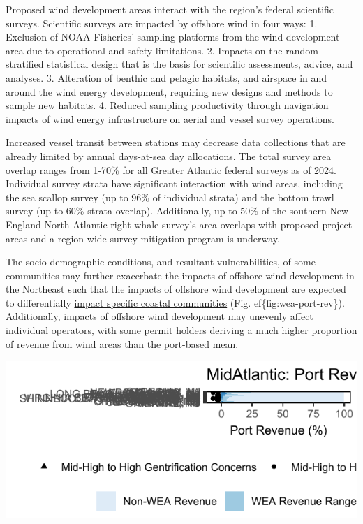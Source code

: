 \documentclass[
  10pt,
]{article}
\let\origfigure\figure
\let\endorigfigure\endfigure
\renewenvironment{figure}[1][2] {
    \expandafter\origfigure\expandafter[H]
} {
    \endorigfigure
}
\begin{document}
Proposed wind development areas interact with the region's federal scientific surveys. Scientific surveys are impacted by offshore wind in four ways:
1. Exclusion of NOAA Fisheries' sampling platforms from the wind development area due to operational and safety limitations.
2. Impacts on the random-stratified statistical design that is the basis for scientific assessments, advice, and analyses.
3. Alteration of benthic and pelagic habitats, and airspace in and around the wind energy development, requiring new designs and methods to sample new habitats.
4. Reduced sampling productivity through navigation impacts of wind energy infrastructure on aerial and vessel survey operations.

Increased vessel transit between stations may decrease data collections that are already limited by annual days-at-sea day allocations. The total survey area overlap ranges from 1-70\% for all Greater Atlantic federal surveys as of 2024. Individual survey strata have significant interaction with wind areas, including the sea scallop survey (up to 96\% of individual strata) and the bottom trawl survey (up to 60\% strata overlap). Additionally, up to 50\% of the southern New England North Atlantic right whale survey's area overlaps with proposed project areas and a region-wide survey mitigation program is underway.

The socio-demographic conditions, and resultant vulnerabilities, of some communities may further exacerbate the impacts of offshore wind development in the Northeast such that the impacts of offshore wind development are expected to differentially \href{https://noaa-edab.github.io/catalog/wind_port.html}{impact specific coastal communities} (Fig. ef\{fig:wea-port-rev\}). Additionally, impacts of offshore wind development may unevenly affect individual operators, with some permit holders deriving a much higher proportion of revenue from wind areas than the port-based mean.

\begin{figure}

\includegraphics{midatlantic_files/figure-latex/wea-port-rev-1} \hfill{}

\caption{Percent of Mid-Atlantic port revenue from Wind Energy Areas (WEA) in descending order from most to least port revenue from WEA.}\label{fig:wea-port-rev}
\end{figure}
\end{document}
